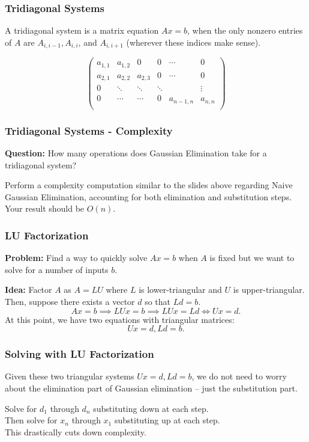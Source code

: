 \documentclass[12pt]{beamer}
\theoremstyle{definition}
\begin{document}
\begin{frame}
\frametitle{Tridiagonal Systems}
A tridiagonal system is a matrix equation $Ax = b$,
when the only nonzero entries of $A$ are $A_{i,i-1}, A_{i,i}$,
and $A_{i,i+1}$ (wherever these indices make sense).

\[
\left(\begin{array}{cccccc}
a_{1,1} & a_{1,2} & 0 & 0 & \cdots & 0 \\
a_{2,1} & a_{2,2} & a_{2,3} & 0 & \cdots & 0 \\[3mm]
0 & \ddots & \ddots & \ddots & &\vdots \\[3mm]
0  & \cdots & \cdots & 0 & a_{n-1,n} & a_{n,n}  \\
\end{array}\right)
\]
\end{frame}

\begin{frame}
\frametitle{Tridiagonal Systems - Complexity}

{\bf Question:} How many operations does Gaussian Elimination take
for a tridiagonal system?

\vspace{1cm}

Perform a complexity computation similar to the slides
above regarding Naive Gaussian Elimination, accounting for
both elimination and substitution steps. Your result should
be $O(n)$.
\end{frame}

\begin{frame}
\frametitle{LU Factorization}
{\bf Problem:} Find a way to quickly solve $Ax = b$ when $A$ is fixed
but we want to solve for a number of inputs $b$.

\vspace{1cm} 

{\bf Idea:} Factor $A$ as $A = LU$ where $L$ is lower-triangular
and $U$ is upper-triangular. Then, suppose there exists a vector $d$
so that $Ld = b$.
\[ Ax = b \implies LUx = b \implies LUx = Ld \iff Ux = d.\]
At this point, we have two equations with triangular matrices:
\[ Ux = d, Ld = b.\]

\end{frame}

\begin{frame}
\frametitle{Solving with LU Factorization}
Given these two triangular systems $Ux = d, Ld = b$, we
do not need to worry about the elimination part of Gaussian elimination
-- just the substitution part. 

\vspace{5mm}

Solve for $d_1$ through $d_n$ substituting down at each step.\\
Then solve for $x_n$ through $x_1$ substituting up at each step.\\
This drastically cuts down complexity.
\end{frame}
\end{document}
